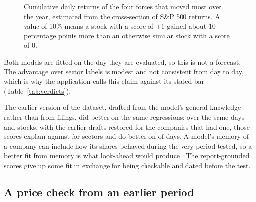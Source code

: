 \documentclass[11pt]{article}
\begin{document}
\begin{figure}[t]
\centering
{}
\caption{Cumulative daily returns of the four forces that moved most over the year, estimated from the cross-section of S\&P 500 returns. A value of 10\% means a stock with a score of $+1$ gained about 10 percentage points more than an otherwise similar stock with a score of 0.}\label{fig:forces}
\end{figure}

Both models are fitted on the day they are evaluated, so this is not a forecast. The advantage over sector labels is modest and not consistent from day to day, which is why the application calls this claim \verdictSectors{} against its stated bar (Table~\ref{tab:verdicts}).

The earlier version of the dataset, drafted from the model's general knowledge rather than from filings, did better on the same regressions: over the same days and stocks, with the earlier drafts restored for the \nMemoryCompared{} companies that had one, those scores explain \memExposures{} against \memSectors{} for sectors and do better on \memDaysBetter{} of days. A model's memory of a company can include how its shares behaved during the very period tested, so a better fit from memory is what look-ahead would produce \citep{lopezlira2023, glasserman2023}. The report-grounded scores give up some fit in exchange for being checkable and dated before the test.

\subsection{A price check from an earlier period}
\end{document}

